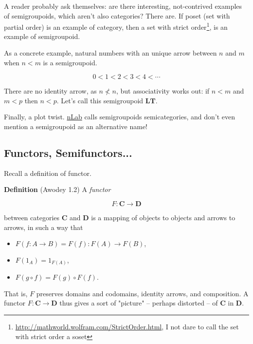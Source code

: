 \documentclass{article}
\begin{document}
A reader probably ask themselves: are there interesting, not-contrived
examples of semigroupoids, which aren't also categories?
There are. If poset (set with partial order) is 
an example of category, then a set with strict order\footnote{\url{http://mathworld.wolfram.com/StrictOrder.html}, I not dare to call the set with strict order a soset},
is an example of semigroupoid.

As a concrete example, natural numbers with an unique arrow between $n$ and $m$ when $n < m$ is a semigroupoid.

\begin{equation}
0 < 1 < 2 < 3 < 4 < \cdots
\end{equation}

There are no identity arrow, as $n \not< n$, but associativity works out:
if $n < m$ and $m < p$ then $n < p$. Let's call this semigroupoid $\mathbf{LT}$.

Finally, a plot twist. \href{https://ncatlab.org/nlab/show/semicategory}{nLab} calls semigroupoids semicategories,
and don't even mention a semigroupoid as an alternative name!

\subsection{Functors, Semifunctors...}

Recall a definition of functor.

\begin{definition}[Awodey 1.2]\textbf{Definition} (Awodey 1.2)
A \emph{functor}

\begin{equation*}
F : \mathbf{C} \to \mathbf{D}
\end{equation*}

between categories $\mathbf{C}$ and $\mathbf{D}$ is a mapping of objects
to objects and arrows to arrows, in such a way that
\begin{itemize}
\item $F (f : A \to B) = F(f) : F(A) \to F(B)$,
\item $F(1_A) = 1_{F(A)}$,
\item $F(g \circ f) = F(g) \circ F(f)$.
\end{itemize}
That is, $F$ preserves domains and codomains, identity arrows,
and composition. A functor $F : \mathbf{C} \to \mathbf{D}$ thus gives
a sort of "picture" -- perhaps distorted -- of $\mathbf{C}$ in $\mathbf{D}$.
\end{definition}
\end{document}
